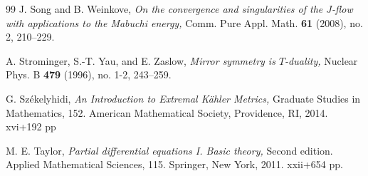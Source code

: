 \documentclass{amsart}
\numberwithin{equation}{section}
\theoremstyle{plain}
\theoremstyle{definition}
\theoremstyle{remark}
\begin{document}
\begin{thebibliography}{99}
  J. Song and B. Weinkove, 
  \textit{On the convergence and singularities of the $J$-flow with applications to the Mabuchi energy,} 
  Comm. Pure Appl. Math. \textbf{61} (2008), no. 2, 210--229. 
 
  A. Strominger, S.-T. Yau, and E. Zaslow, 
  \textit{Mirror symmetry is $T$-duality,}
  Nuclear Phys. B \textbf{479} (1996), no. 1-2, 243--259.
 
  G. Sz{\'e}kelyhidi,
  \textit{An Introduction to Extremal K{\"a}hler Metrics,}
  Graduate Studies in Mathematics, 152. American Mathematical Society, Providence, RI, 2014. xvi+192 pp

  M. E. Taylor,
  \textit{Partial differential equations I. Basic theory,} 
  Second edition. Applied Mathematical Sciences, 115. Springer, New York, 2011. xxii+654 pp.
\end{thebibliography}
\end{document}
